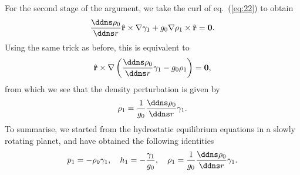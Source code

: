 For the second stage of the argument, we take the curl of eq.~(\ref{eq:22}) to obtain
\begin{equation}
\frac{\ddns \rho_{0}}{\ddns r}\hat{\mathbf{r}}\times\nabla\gamma_{1}+g_{0}\nabla\rho_{1}\times\hat{\mathbf{r}}=\mathbf{0}.
\label{eq:32}
\end{equation}
Using the same trick as before, this is equivalent to
\begin{equation}
\hat{\mathbf{r}}\times\nabla\left(\frac{\ddns \rho_{0}}{\ddns r}\gamma_{1}-g_{0}\rho_{1}\right)=\mathbf{0},
\label{eq:33}
\end{equation}
from which we see that the density perturbation is given by
\begin{equation}
\rho_{1}=\frac{1}{g_{0}}\frac{\ddns \rho_{0}}{\ddns r}\gamma_{1}.
\label{eq:34}
\end{equation}
To summarise, we started from the hydrostatic equilibrium equations in a slowly rotating planet, and have obtained the following identities
\begin{equation}
p_{1}=-\rho_{0}\gamma_{1}, \quad h_{1}=-\frac{\gamma_{1}}{g_{0}}, \quad \rho_{1}=\frac{1}{g_{0}}\frac{\ddns \rho_{0}}{\ddns r}\gamma_{1}.
\label{eq:35}
\end{equation}



